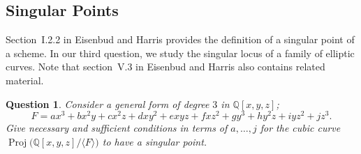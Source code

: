 \documentclass[12pt,noamsfonts]{amsart}
\def\QQ{{\mathbb Q}}
\newcommand{\Proj}{\operatorname{Proj}}
\newtheorem{question}{Question}
\theoremstyle{definition}
\theoremstyle{remark}
\begin{document}
\subsection*{Singular Points}

Section~I.2.2 in Eisenbud and Harris \cite{EH} provides the definition
of a singular point of a scheme.  In our third question, we study the
singular locus of a family of elliptic curves.  Note that section~V.3
in Eisenbud and Harris \cite{EH} also contains related material.

\begin{question} 
Consider a general form of degree $3$ in $\QQ[x,y,z]$;
$$
F =  ax^{3}+bx^{2}y+cx^{2}z+dxy^{2}+exyz+fxz^{2}+gy^{3}+hy^{2}z 
 +iyz^{2}+jz^{3}.
$$
Give necessary and sufficient conditions in terms of $a, \ldots, j$
for the cubic curve $\Proj\big( \QQ[x,y,z] / \langle F \rangle \big)$ to
have a singular point.
\end{question}
\end{document}

